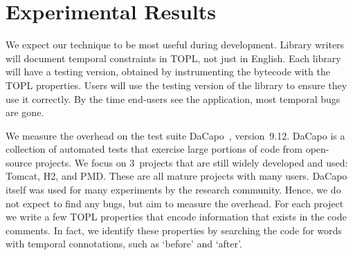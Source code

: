 \documentclass[9pt, preprint]{sigplanconf} %
\newcommand{\noterg}[2]{\textcolor{gray}{[\textcolor{red}{#1}: #2]}}
\newcommand{\dd}[1]{\noterg{dd}{#1}}
\newcommand{\dinocomment}[1]{\dd{#1}}
\theoremstyle{definition}
\theoremstyle{remark}
\begin{document}


\section{Experimental Results}\label{sec:results} %
%


We expect our technique to be most useful during development.
Library writers will document temporal constraints in TOPL, not just in English.
Each library will have a testing version, obtained by instrumenting the bytecode with the TOPL properties.
Users will use the testing version of the library to ensure they use it correctly.
By the time end-users see the application, most temporal bugs are gone.

We measure the overhead on the test suite DaCapo~\cite{dblp:conf/oopsla/dacapo}, version~9.12.
DaCapo is a collection of automated tests that exercise large portions of code from open-source projects.
We focus on $3$~projects that are still widely developed and used: Tomcat, H2, and PMD\null.
These are all mature projects with many users.
DaCapo itself was used for many experiments by the research community.
Hence, we do not expect to find any bugs, but aim to measure the overhead.
For each project we write a few TOPL properties that encode information that exists in the code comments.
In fact, we identify these properties by searching the code for words with temporal connotations, such as `before' and `after'.
\end{document}
